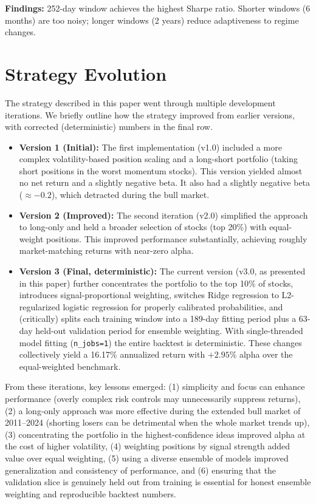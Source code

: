 \documentclass[conference]{IEEEtran}
\begin{document}
\textbf{Findings:} 252-day window achieves the highest Sharpe ratio. Shorter windows (6 months) are too noisy; longer windows (2 years) reduce adaptiveness to regime changes.

\section{Strategy Evolution}\label{sec:evolution}
The strategy described in this paper went through multiple development iterations. We briefly outline how the strategy improved from earlier versions, with corrected (deterministic) numbers in the final row.

\begin{itemize}
    \item \textbf{Version 1 (Initial):} The first implementation (v1.0) included a more complex volatility-based position scaling and a long-short portfolio (taking short positions in the worst momentum stocks). This version yielded almost no net return and a slightly negative beta. It also had a slightly negative beta ($\approx -0.2$), which detracted during the bull market.
    \item \textbf{Version 2 (Improved):} The second iteration (v2.0) simplified the approach to long-only and held a broader selection of stocks (top 20\%) with equal-weight positions. This improved performance substantially, achieving roughly market-matching returns with near-zero alpha.
    \item \textbf{Version 3 (Final, deterministic):} The current version (v3.0, as presented in this paper) further concentrates the portfolio to the top 10\% of stocks, introduces signal-proportional weighting, switches Ridge regression to L2-regularized logistic regression for properly calibrated probabilities, and (critically) splits each training window into a 189-day fitting period plus a 63-day held-out validation period for ensemble weighting. With single-threaded model fitting (\texttt{n\_jobs=1}) the entire backtest is deterministic. These changes collectively yield a 16.17\% annualized return with $+2.95\%$ alpha over the equal-weighted benchmark.
\end{itemize}

From these iterations, key lessons emerged: (1) simplicity and focus can enhance performance (overly complex risk controls may unnecessarily suppress returns), (2) a long-only approach was more effective during the extended bull market of 2011--2024 (shorting losers can be detrimental when the whole market trends up), (3) concentrating the portfolio in the highest-confidence ideas improved alpha at the cost of higher volatility, (4) weighting positions by signal strength added value over equal weighting, (5) using a diverse ensemble of models improved generalization and consistency of performance, and (6) ensuring that the validation slice is genuinely held out from training is essential for honest ensemble weighting and reproducible backtest numbers.
\end{document}
